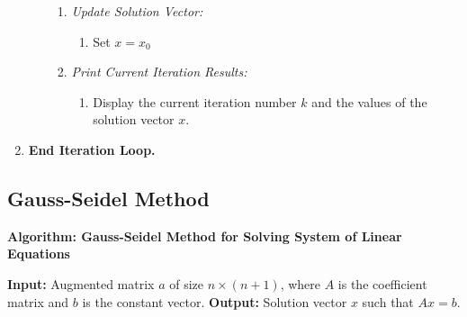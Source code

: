 \documentclass[a4paper,12pt]{article}
\begin{document}
\begin{enumerate}
\begin{enumerate}
\begin{enumerate}
			\item \textit{Update Solution Vector:}
			\begin{enumerate}
				\item Set $x = x_0$
			\end{enumerate}
			
			\item \textit{Print Current Iteration Results:}
			\begin{enumerate}
				\item Display the current iteration number $k$ and the values of the solution vector $x$.
			\end{enumerate}
		\end{enumerate}
	\end{enumerate}
	
	\item \textbf{End Iteration Loop.}
\end{enumerate}

\subsection{Gauss-Seidel Method}

\textbf{Algorithm: Gauss-Seidel Method for Solving System of Linear Equations}

\textbf{Input:} Augmented matrix $a$ of size $n \times (n+1)$, where $A$ is the coefficient matrix and $b$ is the constant vector.  
\textbf{Output:} Solution vector $x$ such that $Ax = b$.
\end{document}

